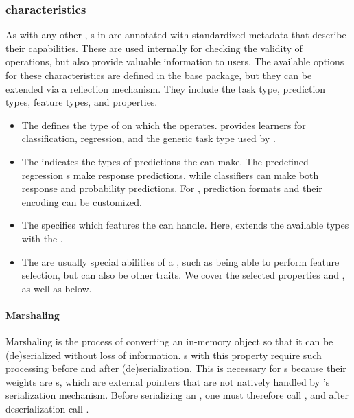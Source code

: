\documentclass[article,shortnames]{jss}
\theoremstyle{definition}
\begin{document}
\subsubsection[Learner characteristics]{ characteristics}\label{sec:learner-characteristics}

As with any other , s in  are annotated with standardized metadata that describe their capabilities.
These are used internally for checking the validity of operations, but also provide valuable information to users.
The available options for these characteristics are defined in the  base package, but they can be extended via a reflection mechanism.
They include the task type, prediction types, feature types, and properties.

\begin{itemize}
    \item The  defines the type of  on which the  operates. \mlrttorch{} provides learners for classification, regression, and the generic  task type used by .
    \item The  indicates the types of predictions the  can make. The predefined \mlrttorch{} regression s make response predictions, while classifiers can make both response and probability predictions. For , prediction formats and their encoding can be customized.
    \item The  specifies which features the  can handle. Here, \mlrttorch{} extends the available types with the .
    \item The  are usually special abilities of a , such as being able to perform feature selection, but can also be other traits. We cover the selected properties  and , as well as  below.
\end{itemize}


\paragraph{Marshaling} Marshaling is the process of converting an in-memory object so that it can be (de)serialized without loss of information.
s with this property require such processing before and after (de)serialization.
This is necessary for \mlrttorch{} s because their weights are s, which are external pointers that are not natively handled by \rlang{}'s serialization mechanism.
Before serializing an \mlrttorch{} , one must therefore call , and after deserialization call .
\end{document}
